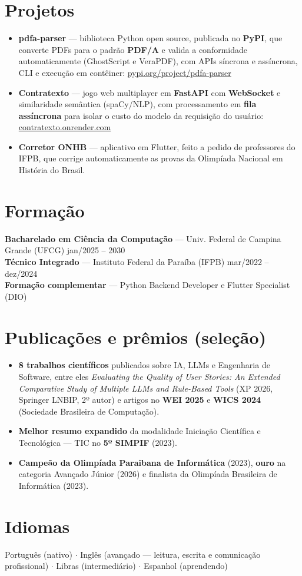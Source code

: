 \documentclass[10.5pt,a4paper]{article}
\begin{document}
\section*{Projetos}
\begin{itemize}
  \item \textbf{pdfa-parser} --- biblioteca Python open source, publicada no \textbf{PyPI}, que
        converte PDFs para o padrão \textbf{PDF/A} e valida a conformidade automaticamente
        (GhostScript e VeraPDF), com APIs síncrona e assíncrona, CLI e execução em contêiner:
        \href{https://pypi.org/project/pdfa-parser}{pypi.org/project/pdfa-parser}
  \item \textbf{Contratexto} --- jogo web multiplayer em \textbf{FastAPI} com \textbf{WebSocket} e
        similaridade semântica (spaCy/NLP), com processamento em \textbf{fila assíncrona} para
        isolar o custo do modelo da requisição do usuário:
        \href{https://contratexto.onrender.com}{contratexto.onrender.com}
  \item \textbf{Corretor ONHB} --- aplicativo em Flutter, feito a pedido de professores do IFPB,
        que corrige automaticamente as provas da Olimpíada Nacional em História do Brasil.
\end{itemize}

\section*{Formação}
\textbf{Bacharelado em Ciência da Computação} --- Univ. Federal de Campina Grande (UFCG)
\hfill jan/2025 -- 2030\\
\textbf{Técnico Integrado} --- Instituto Federal da Paraíba (IFPB) \hfill mar/2022 -- dez/2024\\
\textbf{Formação complementar} --- Python Backend Developer e Flutter Specialist (DIO)

\section*{Publicações e prêmios (seleção)}
\begin{itemize}
  \item \textbf{8 trabalhos científicos} publicados sobre IA, LLMs e Engenharia de Software, entre
        eles \textit{Evaluating the Quality of User Stories: An Extended Comparative Study of
        Multiple LLMs and Rule-Based Tools} (XP 2026, Springer LNBIP, 2º autor) e artigos no
        \textbf{WEI 2025} e \textbf{WICS 2024} (Sociedade Brasileira de Computação).
  \item \textbf{Melhor resumo expandido} da modalidade Iniciação Científica e Tecnológica --- TIC
        no \textbf{5º SIMPIF} (2023).
  \item \textbf{Campeão da Olimpíada Paraibana de Informática} (2023), \textbf{ouro} na categoria
        Avançado Júnior (2026) e finalista da Olimpíada Brasileira de Informática (2023).
\end{itemize}

\section*{Idiomas}
Português (nativo) $\cdot$ Inglês (avançado --- leitura, escrita e comunicação profissional)
$\cdot$ Libras (intermediário) $\cdot$ Espanhol (aprendendo)
\end{document}
